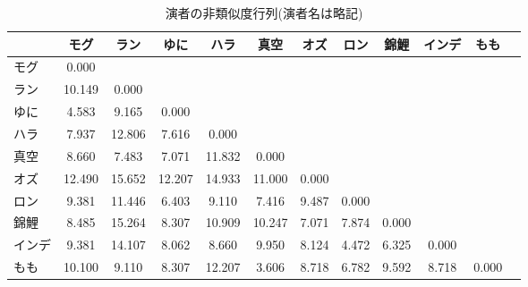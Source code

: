 \begin{table}[ht]
	\centering
	\caption{演者の非類似度行列(演者名は略記)}
	\begin{tabular}{l|ccccccccccc}
		\hline
		    & モグ     & ラン     & ゆに     & ハラ     & 真空     & オズ    & ロン    & 錦鯉    & インデ   & もも    \\
		\hline
		モグ  & 0.000  &        &        &        &        &       &       &       &       &       \\
		ラン  & 10.149 & 0.000  &        &        &        &       &       &       &       &       \\
		ゆに  & 4.583  & 9.165  & 0.000  &        &        &       &       &       &       &       \\
		ハラ  & 7.937  & 12.806 & 7.616  & 0.000  &        &       &       &       &       &       \\
		真空  & 8.660  & 7.483  & 7.071  & 11.832 & 0.000  &       &       &       &       &       \\
		オズ  & 12.490 & 15.652 & 12.207 & 14.933 & 11.000 & 0.000 &       &       &       &       \\
		ロン  & 9.381  & 11.446 & 6.403  & 9.110  & 7.416  & 9.487 & 0.000 &       &       &       \\
		錦鯉  & 8.485  & 15.264 & 8.307  & 10.909 & 10.247 & 7.071 & 7.874 & 0.000 &       &       \\
		インデ & 9.381  & 14.107 & 8.062  & 8.660  & 9.950  & 8.124 & 4.472 & 6.325 & 0.000 &       \\
		もも  & 10.100 & 9.110  & 8.307  & 12.207 & 3.606  & 8.718 & 6.782 & 9.592 & 8.718 & 0.000 \\
		\hline
	\end{tabular}
	\label{tbl:x15_distMat}
\end{table}
